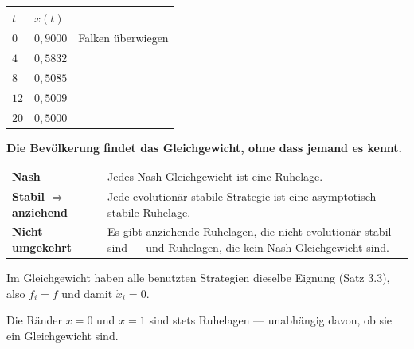 \begin{merksatz}
\begin{center}
{\small
\renewcommand{\arraystretch}{1.48}
\begin{tabular}{@{}P{1.6cm}P{2.2cm}P{2.6cm}@{}}
\toprule
$t$ & $x(t)$ & \\
\midrule
$0$ & $0{,}9000$ & Falken überwiegen\\
$4$ & $0{,}5832$ & \\
$8$ & $0{,}5085$ & \\
$12$ & $0{,}5009$ & \\
$20$ & $0{,}5000$ & \\
\bottomrule
\end{tabular}}
\end{center}

\begin{center}
\begin{minipage}{0.9\textwidth}
\textbf{Die Bevölkerung findet das Gleichgewicht, ohne dass jemand es kennt.}
\end{minipage}
\end{center}
\end{merksatz}

\begin{merksatz}
\begin{center}
{\small
\renewcommand{\arraystretch}{1.52}
\begin{tabular}{@{}P{3.0cm}P{5.6cm}@{}}
\toprule
\textbf{Nash} & Jedes Nash-Gleichgewicht ist eine Ruhelage.\\
\textbf{Stabil $\Rightarrow$ anziehend} & Jede evolutionär stabile Strategie ist eine asymptotisch stabile Ruhelage.\\
\textbf{Nicht umgekehrt} & Es gibt anziehende Ruhelagen, die nicht evolutionär stabil sind --- und Ruhelagen, die kein Nash-Gleichgewicht sind.\\
\bottomrule
\end{tabular}}
\end{center}

Im Gleichgewicht haben alle benutzten Strategien dieselbe Eignung (Satz 3.3), also $f_i = \bar f$ und damit $\dot x_i = 0$.

Die Ränder $x=0$ und $x=1$ sind stets Ruhelagen --- unabhängig davon, ob sie ein Gleichgewicht sind.

\begin{center}
\begin{minipage}{0.88\textwidth}
\end{minipage}
\end{center}
\end{merksatz}

